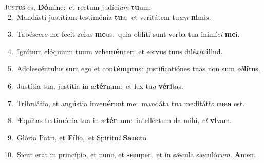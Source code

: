 \lettrine{\initial\textcolor{\initialcolor}{J}}{ustus} es, \textbf{Dó}\-mine:~\star et rectum judíci\textit{um} \textbf{tu}\-um.\\
{\numbfont\textcolor{\numbcolor}{~2.}}~Mandásti justítiam testimónia \textbf{tu}\-a:~\star et veritátem tu\textit{am} \textbf{ni}\-mis.\par
{\numbfont\textcolor{\numbcolor}{~3.}}~Tabéscere me fecit zelus \textbf{me}\-us:~\star quia oblíti sunt verba tua inimí\textit{ci} \textbf{me}\-i.\par
{\numbfont\textcolor{\numbcolor}{~4.}}~Ignítum elóquium tuum vehe\-\textbf{mén}\-ter:~\star et servus tuus dilé\textit{xit} \textbf{il}\-lud.\par
{\numbfont\textcolor{\numbcolor}{~5.}}~Adolescéntulus sum ego et con\-\textbf{témp}\-tus:~\star justificatiónes tuas non sum \textit{ob}\-\textbf{lí}tus.\par
{\numbfont\textcolor{\numbcolor}{~6.}}~Justítia tua, justítia in æ\-\textbf{tér}\-num:~\star et lex tu\textit{a} \textbf{vé}\-\textbf{ri}tas.\par
{\numbfont\textcolor{\numbcolor}{~7.}}~Tribulátio, et angústia inve\-\textbf{né}\-runt me:~\star mandáta tua meditáti\textit{o} \textbf{me}\-\textbf{a} est.\par
{\numbfont\textcolor{\numbcolor}{~8.}}~Æquitas testimónia tua in æ\-\textbf{tér}\-num:~\star intelléctum da mihi, \textit{et} \textbf{vi}\-vam.\par
{\numbfont\textcolor{\numbcolor}{~9.}}~Glória Patri, et \textbf{Fí}\-lio,~\star et Spirítu\textit{i} \textbf{Sanc}\-to.\par
{\numbfont\textcolor{\numbcolor}{10.}}~Sicut erat in princípio, et nunc, et \textbf{sem}\-per,~\star et in sǽcula sæculó\-\textit{rum}\-. \textbf{A}\-men.\par

